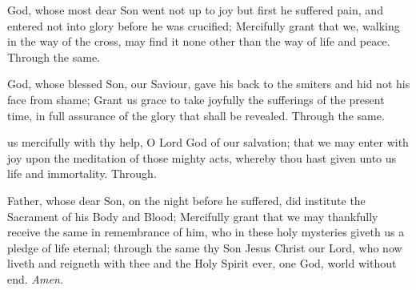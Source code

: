 	 God, whose most dear Son went not up to joy but first he suffered pain, and entered not into glory before he was crucified; Mercifully grant that we, walking in the way of the cross, may find it none other than the way of life and peace. Through the same.
	
	\par\noindent

	 God, whose blessed Son, our Saviour, gave his back to the smiters and hid not his face from shame; Grant us grace to take joyfully the sufferings of the present time, in full assurance of the glory that shall be revealed. Through the same.
	
	\par\noindent

     us mercifully with thy help, O Lord God of our salvation; that we may enter with joy upon the meditation of those mighty acts, whereby thou hast given unto us life and immortality. Through.
	
    \par\noindent

     Father, whose dear Son, on the night before he suffered, did institute the Sacrament of his Body and Blood; Mercifully grant that we may thankfully receive the same in remembrance of him, who in these holy mysteries giveth us a pledge of life eternal; through the same thy Son Jesus Christ our Lord, who now liveth and reigneth with thee and the Holy Spirit ever, one God, world without end. \textit{Amen.}
    
